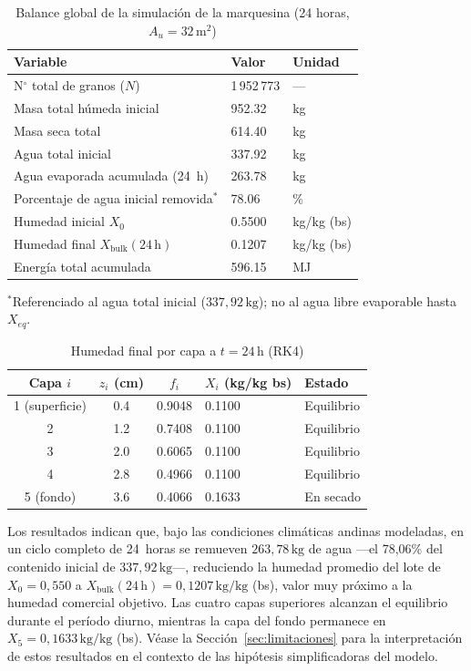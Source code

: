\documentclass[conference]{IEEEtran}
\begin{document}
\begin{table}[H]
\centering
\caption{Balance global de la simulación de la marquesina (24 horas, $A_u = 32\,\text{m}^2$)}
\begin{tabular}{lll}
\toprule
Variable & Valor & Unidad \\
\midrule
N$^\circ$ total de granos ($N$) & 1\,952\,773 & — \\
Masa total húmeda inicial & 952.32 & kg \\
Masa seca total & 614.40 & kg \\
Agua total inicial & 337.92 & kg \\
Agua evaporada acumulada (24~h) & 263.78 & kg \\
Porcentaje de agua inicial removida$^*$ & 78.06 & \% \\
Humedad inicial $X_0$ & 0.5500 & kg/kg (bs) \\
Humedad final $X_{\text{bulk}}(24\,\text{h})$ & 0.1207 & kg/kg (bs) \\
Energía total acumulada & 596.15 & MJ \\
\bottomrule
\end{tabular}
\par\smallskip
{\footnotesize $^*$Referenciado al agua total inicial ($337{,}92\,\text{kg}$); no al agua libre evaporable hasta $X_{eq}$.}
\end{table}

\begin{table}[H]
\centering
\caption{Humedad final por capa a $t = 24\,\text{h}$ (RK4)}
\begin{tabular}{cccll}
\toprule
Capa $i$ & $z_i$ (cm) & $f_i$ & $X_i$ (kg/kg bs) & Estado \\
\midrule
1 (superficie) & 0.4 & 0.9048 & 0.1100 & Equilibrio \\
2 & 1.2 & 0.7408 & 0.1100 & Equilibrio \\
3 & 2.0 & 0.6065 & 0.1100 & Equilibrio \\
4 & 2.8 & 0.4966 & 0.1100 & Equilibrio \\
5 (fondo) & 3.6 & 0.4066 & 0.1633 & En secado \\
\bottomrule
\end{tabular}
\end{table}

Los resultados indican que, bajo las condiciones climáticas andinas modeladas, en un ciclo completo de 24~horas se remueven $263{,}78\,\text{kg}$ de agua —el 78{,}06\% del contenido inicial de $337{,}92\,\text{kg}$—, reduciendo la humedad promedio del lote de $X_0 = 0{,}550$ a $X_{\text{bulk}}(24\,\text{h}) = 0{,}1207\,\text{kg/kg}$ (bs), valor muy próximo a la humedad comercial objetivo. Las cuatro capas superiores alcanzan el equilibrio durante el período diurno, mientras la capa del fondo permanece en $X_5 = 0{,}1633\,\text{kg/kg}$ (bs). Véase la Sección~\ref{sec:limitaciones} para la interpretación de estos resultados en el contexto de las hipótesis simplificadoras del modelo.
\end{document}
